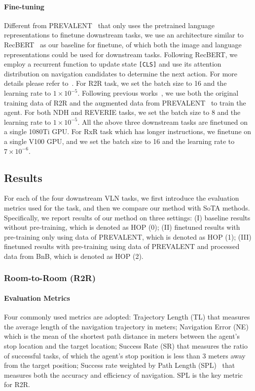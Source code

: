 \documentclass[10pt,twocolumn,letterpaper]{article}
\begin{document}
\paragraph{Fine-tuning}
Different from PREVALENT~\cite{prevalent} that only uses the pretrained language representations to finetune downstream tasks, 
we use an architecture similar to RecBERT~\cite{bertvln} as our baseline for finetune, of which both the image and language representations could be used for downstream tasks.
Following RecBERT, we employ a recurrent function to update state \texttt{[CLS]} and use its attention distribution on navigation candidates to determine the next action. For more details please refer to~\cite{recurrent}.
For R2R task, we set the batch size to 16 and the learning rate to $1\!\times\!10^{-5}$. 
Following previous works~\cite{recurrent}, we use both the original training data of R2R and the augmented data from PREVALENT~\cite{prevalent} to train the agent.
For both NDH and REVERIE tasks, we set the batch size to 8 and the learning rate to $1\!\times\!10^{-5}$.
All the above three downstream tasks are finetuned on a single 1080Ti GPU. 
For RxR task which has longer instructions, we finetune on a single V100 GPU, and we set the batch size to 16 and the learning rate to $7\!\times\!10^{-6}$.

\subsection{Results}
For each of the four downstream VLN tasks, we first introduce the evaluation metrics used for the task, and then we compare our method with SoTA methods. 
Specifically, we report results of our method on three settings: (I) baseline results without pre-training, which is denoted as HOP (0); (II) finetuned results with pre-training only using data of PREVALENT, which is denoted as HOP (1); (III) finetuned results with pre-training using data of PREVALENT and processed data from BnB, which is denoted as HOP (2).

\vspace{-8pt}
\subsubsection{Room-to-Room (R2R)}

\vspace{-5pt}
\paragraph{Evaluation Metrics}
Four commonly used metrics are adopted:
Trajectory Length (TL) that measures the average length of the navigation trajectory in meters;
Navigation Error (NE) which is the mean of the shortest path distance in meters between the agent’s stop location and the target location; 
Success Rate (SR) that measures the ratio of successful tasks, of which the agent's stop position is less than 3 meters away from the target position; 
Success rate weighted by Path Length (SPL)~\cite{spl} that measures both the accuracy and efficiency of navigation. SPL is the key metric for R2R.
\end{document}
